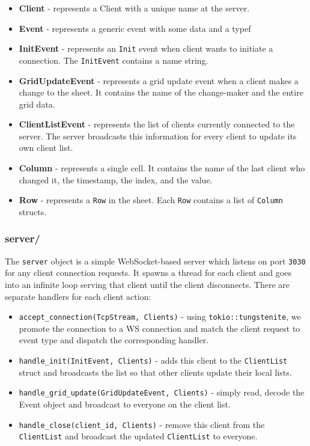 \begin{itemize}
    \item \textbf{Client} - represents a Client with a unique name at the server.
    \item \textbf{Event} - represents a generic event with some data and a typef
    \item \textbf{InitEvent} - represents an \verb|Init| event when client wants to initiate a connection. The \verb|InitEvent| contains a name string.
    \item \textbf{GridUpdateEvent} - represents a grid update event when a client makes a change to the sheet. It contains the name of the change-maker and the entire grid data.
    \item \textbf{ClientListEvent} - represents the list of clients currently connected to the server. The server broadcasts this information for every client to update its own client list.
    \item \textbf{Column} - represents a single cell. It contains the name of the last client who changed it, the timestamp, the index, and the value.
    \item \textbf{Row} - represents a \verb|Row| in the sheet. Each \verb|Row| contains a list of \verb|Column| structs.
\end{itemize}

\subsubsection{\textbf{server/}}

The \verb|server| object is a simple WebSocket-based server which listens on port \verb|3030| for any client connection requests. It spawns a thread for each client and goes into an infinite loop serving that client until the client disconnects. There are separate handlers for each client action: 
\begin{itemize}
    \item \verb|accept_connection(TcpStream, Clients)| - using \verb|tokio::tungstenite|, we promote the connection to a WS connection and match the client request to event type and dispatch the corresponding handler.
    \item \verb|handle_init(InitEvent, Clients)| - adds this client to the \verb|ClientList| struct and broadcasts the list so that other clients update their local lists.
    \item \verb|handle_grid_update(GridUpdateEvent, Clients)| - simply read, decode the Event object and broadcast to everyone on the client list.
    \item \verb|handle_close(client_id, Clients)| - remove this client from the \verb|ClientList| and broadcast the updated \verb|ClientList| to everyone. 
\end{itemize}

